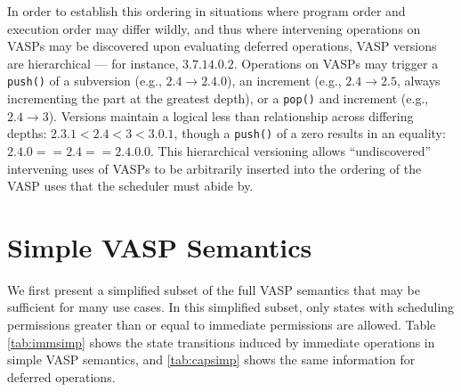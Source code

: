 In order to establish this ordering in situations where program order and
execution order may differ wildly, and thus where intervening operations on
VASPs may be discovered upon evaluating deferred operations, VASP versions are
hierarchical --- for instance, $3.7.14.0.2$.  Operations on VASPs may
trigger a {\tt push()} of a subversion (e.g., $2.4 \rightarrow
2.4.0$), an increment (e.g., $2.4 \rightarrow 2.5$, always incrementing
the part at the greatest depth), or a {\tt pop()} and increment (e.g., $2.4
\rightarrow 3$).  Versions maintain a logical less than relationship across
differing depths: $2.3.1 < 2.4 < 3 < 3.0.1$, though a {\tt push()} of a zero
results in an equality: $2.4.0 == 2.4 == 2.4.0.0$.  This hierarchical versioning
allows ``undiscovered'' intervening uses of VASPs to be arbitrarily inserted
into the ordering of the VASP uses that the scheduler must abide by.


\section{Simple VASP Semantics}
\label{sec:simplevasp}

We first present a simplified subset of the full VASP semantics that may be
sufficient for many use cases.  In this simplified subset, only states with
scheduling permissions greater than or equal to immediate permissions are
allowed.  Table \ref{tab:immsimp} shows the state transitions induced by
immediate operations in simple VASP semantics, and \ref{tab:capsimp} shows the
same information for deferred operations.


